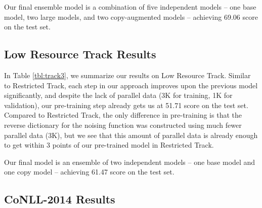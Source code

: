 \documentclass[11pt,a4paper]{article}
\begin{document}
Our final ensemble model is a combination of five independent models -- one base model, two large models, and two copy-augmented models -- achieving 69.06  score on the test set. 


\subsection{Low Resource Track Results}\label{sec:track3}

In Table \ref{tbl:track3}, we summarize our results on Low Resource Track. 
Similar to Restricted Track, each step in our approach improves upon the previous model significantly, and despite the lack of parallel data (3K for training, 1K for validation), our pre-training step already gets us at 51.71  score on the test set. 
Compared to Restricted Track, the only difference in pre-training is that the reverse dictionary for the noising function was constructed using much fewer parallel data (3K), but we see that this amount of parallel data is already enough to get within 3 points of our pre-trained model in Restricted Track.

Our final model is an ensemble of two independent models -- one base model and one copy model -- achieving 61.47  score on the test set.

\subsection{CoNLL-2014 Results}\label{sec:track0}
\end{document}
